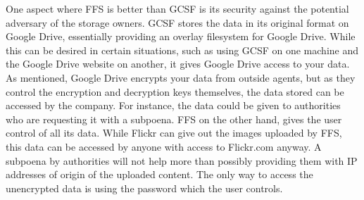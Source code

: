 One aspect where FFS is better than GCSF is its security against the potential adversary of the storage owners. GCSF stores the data in its original format on Google Drive, essentially providing an overlay filesystem for Google Drive. While this can be desired in certain situations, such as using GCSF on one machine and the Google Drive website on another, it gives Google Drive access to your data. As mentioned, Google Drive encrypts your data from outside agents, but as they control the encryption and decryption keys themselves, the data stored can be accessed by the company. For instance, the data could be given to authorities who are requesting it with a subpoena. FFS on the other hand, gives the user control of all its data. While Flickr can give out the images uploaded by FFS, this data can be accessed by anyone with access to Flickr.com anyway. A subpoena by authorities will not help more than possibly providing them with IP addresses of origin of the uploaded content. The only way to access the unencrypted data is using the password which the user controls.